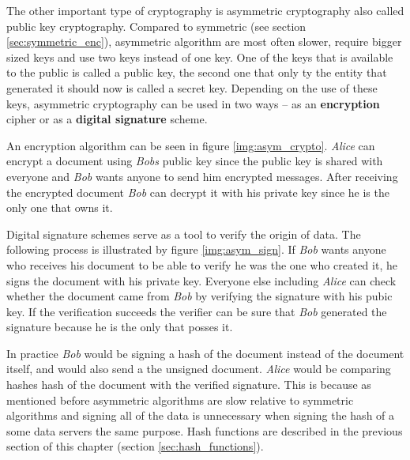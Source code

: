 The other important type of cryptography is asymmetric cryptography also called public key cryptography. Compared to symmetric (see section \ref{sec:symmetric_enc}), asymmetric algorithm are most often slower, require bigger sized keys and use two keys instead of one key. One of the keys that is available to the public is called a public key, the second one that only ty the entity that generated it should now is called a secret key. Depending on the use of these keys, asymmetric cryptography can be used in two ways -- as an \textbf{encryption} cipher or as a \textbf{digital signature} scheme.

An encryption algorithm can be seen in figure \ref{img:asym_crypto}. \textit{Alice} can encrypt a document using \textit{Bobs} public key since the public key is shared with everyone and \textit{Bob} wants anyone to send him encrypted messages. After receiving the encrypted document \textit{Bob} can decrypt it with his private key since he is the only one that owns it. \cite{Smart2004}


Digital signature schemes serve as a tool to verify the origin of data. The following process is illustrated by figure \ref{img:asym_sign}. If \textit{Bob} wants anyone who receives his document to be able to verify he was the one who created it, he signs the document with his private key. Everyone else including \textit{Alice} can check whether the document came from \textit{Bob} by verifying the signature with his pubic key. If the verification succeeds the verifier can be sure that \textit{Bob} generated the signature because he is the only that posses it. \cite{Paar2010}

In practice \textit{Bob} would be signing a hash of the document instead of the document itself, and would also send a the unsigned document. \textit{Alice} would be comparing hashes hash of the document with the verified signature. This is because as mentioned before asymmetric algorithms are slow relative to symmetric algorithms and signing all of the data is unnecessary when signing the hash of a some data servers the same purpose. Hash functions are described in the previous section of this chapter (section \ref{sec:hash_functions}).


